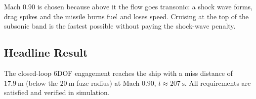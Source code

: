 Mach $0.90$ is chosen because above it the flow goes transonic: a shock wave forms, drag spikes and the missile burns fuel and loses speed. Cruising at the top of the subsonic band is the fastest possible without paying the shock-wave penalty.

\subsection{Headline Result}

The closed-loop 6DOF engagement reaches the ship with a miss distance of $17.9~\text{m}$ (below the $20~\text{m}$ fuze radius) at Mach $0.90$, $t\approx 207~\text{s}$. All requirements are satisfied and verified in simulation.
